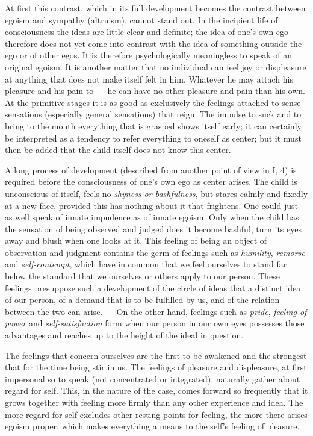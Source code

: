 \documentclass[12pt,a4paper]{book}
\newcommand{\opage}[1]{\marginnote{\footnotesize\textit{[#1]}}}
\begin{document}
At first this contrast, which in its full development becomes the
contrast between egoism and sympathy (altruism), cannot stand out. In
the incipient life of consciousness the ideas are little clear and
definite; the idea of one's own ego therefore does not yet come into
contrast with the idea of something outside the ego or of other egos. It
is therefore psychologically meaningless to speak of an original egoism.
It is another matter that no individual can feel joy or displeasure at
anything that does not make itself felt in
\opage{293}him. Whatever he may attach his pleasure and his pain to ---
he can have no other pleasure and pain than his own. At the primitive
stages it is as good as exclusively the feelings attached to
sense-sensations (especially general sensations) that reign. The
impulse to suck and to bring to the mouth everything that is grasped
shows itself early; it can certainly be interpreted as a tendency to
refer everything to oneself as center; but it must then be added that
the child itself does not know this center.

A long process of development (described from another point of view in
I, 4) is required before the consciousness of one's own ego as center
arises. The child is unconscious of itself, feels no \emph{shyness or
bashfulness}, but stares calmly and fixedly at a new face, provided
this has nothing about it that frightens. One could just as well speak
of innate impudence as of innate egoism. Only when the child has the
sensation of being observed and judged does it become bashful, turn its
eyes away and blush when one looks at it. This feeling of being an
object of observation and judgment contains the germ of feelings such
as \emph{humility}, \emph{remorse} and \emph{self-contempt}, which have
in common that we feel ourselves to stand far below the standard that we
ourselves or others apply to our person. These feelings presuppose such
a development of the circle of ideas that a distinct idea of our person,
of a demand that is to be fulfilled by us, and of the relation between
the two can arise. --- On the other hand, feelings such as \emph{pride},
\emph{feeling of power} and \emph{self-satisfaction} form when our
person in our own eyes possesses those advantages and reaches up to the
height of the ideal in question.

The feelings that concern ourselves are the first to be awakened and the
strongest that for the time being stir in us. The feelings of pleasure
and displeasure, at first impersonal so to speak (not concentrated or
integrated), naturally gather about regard for self. This, in the nature
of the case, comes forward so frequently that it grows together with
feeling more firmly than any other experience and idea. The more regard
for self excludes other resting points for feeling, the more there
arises egoism proper, which makes everything a means to the self's
feeling of pleasure.
\end{document}
